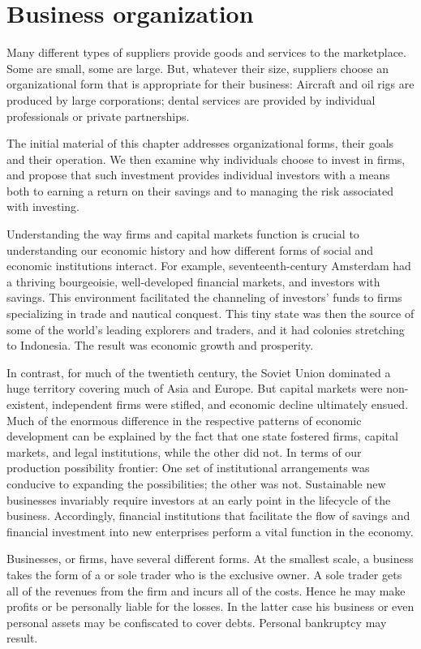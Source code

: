 \section{Business organization}\label{sec:ch7sec1}

Many different types of suppliers provide goods and services to the
marketplace. Some are small, some are large. But, whatever their size,
suppliers choose an organizational form that is appropriate for their
business: Aircraft and oil rigs are produced by large corporations; dental
services are provided by individual professionals or private partnerships.

The initial material of this chapter addresses organizational forms, their
goals and their operation. We then examine why individuals choose to invest
in firms, and propose that such investment provides individual investors
with a means both to earning a return on their savings and to managing the
risk associated with investing.

Understanding the way firms and capital markets function is crucial to
understanding our economic history and how different forms of social and
economic institutions interact. For example, seventeenth-century Amsterdam
had a thriving bourgeoisie, well-developed financial markets, and investors
with savings. This environment facilitated the channeling of investors'
funds to firms specializing in trade and nautical conquest. This tiny state
was then the source of some of the world's leading explorers and traders,
and it had colonies stretching to Indonesia. The result was economic growth
and prosperity.

In contrast, for much of the twentieth century, the Soviet Union dominated a
huge territory covering much of Asia and Europe. But capital markets were
non-existent, independent firms were stifled, and economic decline
ultimately ensued. Much of the enormous difference in the respective
patterns of economic development can be explained by the fact that one state
fostered firms, capital markets, and legal institutions, while the other did not. In terms of our
production possibility frontier: One set of institutional arrangements was
conducive to expanding the possibilities; the other was not. Sustainable new
businesses invariably require investors at an early point in the lifecycle
of the business. Accordingly, financial institutions that facilitate the
flow of savings and financial investment into new enterprises perform a
vital function in the economy.

Businesses, or firms, have several different forms. At the smallest scale, a
business takes the form of a  or sole trader
who is the exclusive owner. A sole trader gets all of the revenues from the
firm and incurs all of the costs. Hence he may make profits or be personally
liable for the losses. In the latter case his business or even personal
assets may be confiscated to cover debts. Personal bankruptcy may result.

